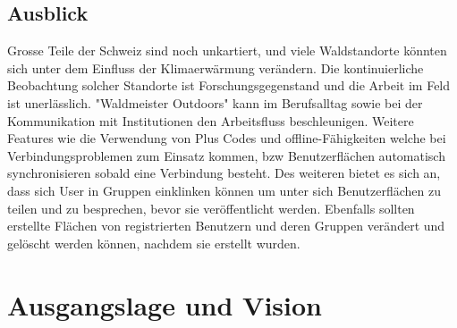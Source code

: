 \section{Ausblick}
Grosse Teile der Schweiz sind noch unkartiert, und viele Waldstandorte k\"onnten sich unter dem Einfluss der Klimaerw\"armung ver\"andern. Die kontinuierliche Beobachtung solcher Standorte ist Forschungsgegenstand und die Arbeit im Feld ist unerl\"asslich. "Waldmeister Outdoors" kann im Berufsalltag sowie bei der Kommunikation mit Institutionen den Arbeitsfluss beschleunigen. Weitere Features wie die Verwendung von Plus Codes und offline-F\"ahigkeiten welche bei Verbindungsproblemen zum Einsatz kommen, bzw Benutzerfl\"achen automatisch synchronisieren sobald eine Verbindung besteht. Des weiteren bietet es sich an, dass sich User in Gruppen einklinken k\"onnen um unter sich Benutzerfl\"achen zu teilen und zu besprechen, bevor sie ver\"offentlicht werden. Ebenfalls sollten erstellte Fl\"achen von registrierten Benutzern und deren Gruppen ver\"andert und gel\"oscht werden k\"onnen, nachdem sie erstellt wurden.

\chapter{Ausgangslage und Vision}
